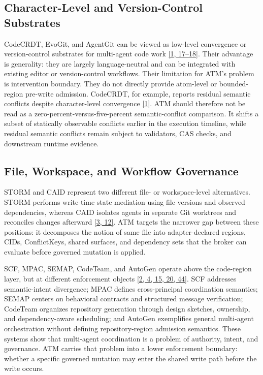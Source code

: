 \documentclass[9pt,letterpaper]{extarticle}
\begin{document}
\subsection{Character-Level and Version-Control Substrates}

CodeCRDT, EvoGit, and AgentGit can be viewed as low-level convergence or version-control substrates for multi-agent code work \textcolor{atmLinkBlue}{\hyperlink{Item.37}{[1, 17--18]}}. Their advantage is generality: they are largely language-neutral and can be integrated with existing editor or version-control workflows. Their limitation for ATM's problem is intervention boundary. They do not directly provide atom-level or bounded-region pre-write admission. CodeCRDT, for example, reports residual semantic conflicts despite character-level convergence \textcolor{atmLinkBlue}{\hyperlink{Item.37}{[1]}}. ATM should therefore not be read as a zero-percent-versus-five-percent semantic-conflict comparison. It shifts a subset of statically observable conflicts earlier in the execution timeline, while residual semantic conflicts remain subject to validators, CAS checks, and downstream runtime evidence.

\subsection{File, Workspace, and Workflow Governance}

STORM and CAID represent two different file- or workspace-level alternatives. STORM performs write-time state mediation using file versions and observed dependencies, whereas CAID isolates agents in separate Git worktrees and reconciles changes afterward \textcolor{atmLinkBlue}{\hyperlink{Item.39}{[3, 12]}}. ATM targets the narrower gap between these positions: it decomposes the notion of same file into adapter-declared regions, CIDs, ConflictKeys, shared surfaces, and dependency sets that the broker can evaluate before governed mutation is applied.

SCF, MPAC, SEMAP, CodeTeam, and AutoGen operate above the code-region layer, but at different enforcement objects \textcolor{atmLinkBlue}{\hyperlink{Item.38}{[2, 4, 15, 20, 44]}}. SCF addresses semantic-intent divergence; MPAC defines cross-principal coordination semantics; SEMAP centers on behavioral contracts and structured message verification; CodeTeam organizes repository generation through design sketches, ownership, and dependency-aware scheduling; and AutoGen exemplifies general multi-agent orchestration without defining repository-region admission semantics. These systems show that multi-agent coordination is a problem of authority, intent, and governance. ATM carries that problem into a lower enforcement boundary: whether a specific governed mutation may enter the shared write path before the write occurs.
\end{document}
